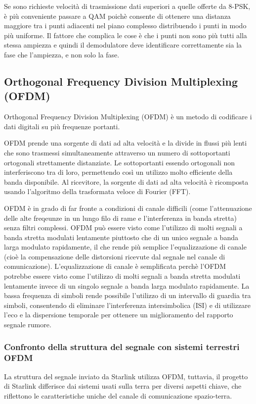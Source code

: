 Se sono richieste velocità di trasmissione dati superiori a quelle offerte da 8-\ac{PSK}, è più conveniente passare a \ac{QAM} poichè consente di ottenere una distanza maggiore tra i punti adiacenti nel piano complesso distribuendo i punti in modo più uniforme.
Il fattore che complica le cose è che i punti non sono più tutti alla stessa ampiezza e quindi il demodulatore deve identificare correttamente sia la fase che l'ampiezza, e non solo la fase.

\subsection{Orthogonal Frequency Division Multiplexing (OFDM)}
Orthogonal Frequency Division Multiplexing (\acs{OFDM}) è un metodo di codificare i dati digitali su più frequenze portanti.

\ac{OFDM} prende una sorgente di dati ad alta velocità e la divide in flussi più lenti che sono trasmessi simultaneamente attraverso un numero di sottoportanti ortogonali strettamente distanziate.
Le sottoportanti essendo ortogonali non interferiscono tra di loro, permettendo così un utilizzo molto efficiente della banda disponibile.
Al ricevitore, la sorgente di dati ad alta velocità è ricomposta usando l'algoritmo della trasformata veloce di Fourier (FFT).

\ac{OFDM} è in grado di far fronte a condizioni di canale difficili (come l'attenuazione delle alte freqeunze in un lungo filo di rame e l'interferenza in banda stretta) senza filtri complessi.
\ac{OFDM} può essere visto come l'utilizzo di molti segnali a banda stretta modulati lentamente piuttosto che di un unico segnale a banda larga modulato rapidamente, il che rende più semplice l'equalizzazione di canale (cioè la compensazione delle distorsioni ricevute dal segnale nel canale di comunicazione).
L'equalizzazione di canale è semplificata perchè l'\ac{OFDM} potrebbe essere visto come l'utilizzo di molti segnali a banda stretta modulati lentamente invece di un singolo segnale a banda larga modulato rapidamente.
La bassa frequenza di simboli rende possibile l'utilizzo di un intervallo di guardia tra simboli, consentendo di eliminare l'interferenza intersimbolica (ISI) e di utilizzare l'eco e la dispersione temporale per ottenere un miglioramento del rapporto segnale rumore.

\subsubsection{Confronto della struttura del segnale con sistemi terrestri OFDM}
La struttura del segnale inviato da Starlink utilizza \ac{OFDM}, tuttavia, il progetto di Starlink differisce dai sistemi usati sulla terra per diversi aspetti chiave, che riflettono le caratteristiche uniche del canale di comunicazione spazio-terra.

